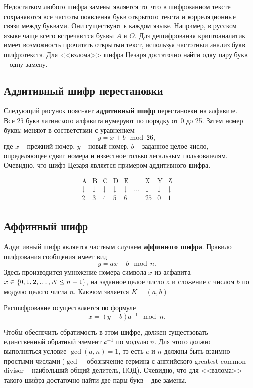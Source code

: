 Недостатком любого шифра замены является то, что в шифрованном тексте сохраняются все частоты появления букв открытого текста и корреляционные связи между буквами. Они существуют в каждом языке. Например, в русском языке чаще всего встречаются буквы $A$ и $O$. Для дешифрования криптоаналитик имеет возможность прочитать открытый текст, используя частотный анализ букв шифротекста. Для <<взлома>> шифра Цезаря достаточно найти одну пару букв -- одну замену.

\subsection{Аддитивный шифр перестановки}

Следующий рисунок
поясняет \textbf{аддитивный шифр} перестановки на алфавите. Все 26 букв латинского алфавита нумеруют по порядку от 0 до 25. Затем номер буквы меняют в соответствии с уравнением
    \[ y = x + b \mod 26, \]
где $x$ -- прежний номер, $y$ -- новый номер, $b$ -- заданное целое число, определяющее сдвиг номера и известное только легальным пользователям. Очевидно, что шифр Цезаря является примером аддитивного шифра.
  	
\[ \begin{array}{ccccccccc}
    \text{A} & \text{B} & \text{C} & \text{D} & \text{E} & & \text{X} & \text{Y} & \text{Z} \\
    \downarrow & \downarrow & \downarrow & \downarrow & \downarrow & \dots & \downarrow & \downarrow & \downarrow \\
    2 & 3 & 4 & 5 & 6 & & 25 & 0 & 1 \\
\end{array} \]


\subsection{Аффинный шифр}\label{section-affine-cipher}

Аддитивный шифр является частным случаем \textbf{аффинного шифра}. Правило шифрования сообщения имеет вид
    \[ y = a x + b \mod n. \]
Здесь производится умножение номера символа $x$ из алфавита, $x\in \mathbb{\{} 0, 1, 2, \dots, N \leq n-1 \}$, на заданное целое число $a$ и сложение с числом $b$ по модулю целого числа $n$. Ключом является $K = (a, b)$.

Расшифрование осуществляется по формуле
    \[ x = (y - b) a^{-1} \mod n. \]

Чтобы обеспечить обратимость в этом шифре, должен существовать единственный обратный элемент $a^{-1}$ по модулю $n$. Для этого должно выполняться условие $\gcd(a,n) = 1$, то есть $a$ и $n$ должны быть взаимно простыми числами ($\gcd$ -- обозначение термина с английского greatest common divisor -- наибольший общий делитель, $\text{НОД}$). Очевидно, что для <<взлома>> такого шифра достаточно найти две пары букв -- две замены.
